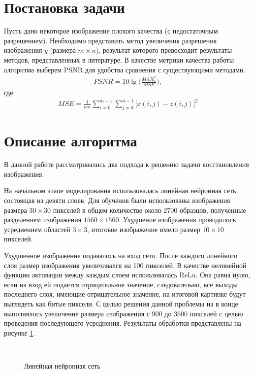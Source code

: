 \documentclass[12pt,twoside]{article}
\begin{document}
\section{Постановка задачи}
	Пусть дано некоторое изображение плохого качества (с недостаточным разрешением). Необходимо представить метод увеличения разрешения изображения $y$ (размера $m\times n$), результат которого превосходит результаты методов, представленных в литературе. В качестве метрики качества работы алгоритма выберем PSNR для удобства сравнения с существующими методами. 
	\begin{gather}
		PSNR = 10\lg\bigg(\frac{MAX_x^2}{MSE} \bigg),
	\end{gather}
	где
	\begin{gather}
		MSE = \frac{1}{mn}\sum_{i=0}^{m-1}\sum_{j=0}^{n-1}\big[x(i,j)-z(i,j)\big]^2
	\end{gather}
	
\section{Описание алгоритма}

	В данной работе рассматривались два подхода к решению задачи восстановления изображения. 

	На начальном этапе моделирования использовалась линейная нейронная сеть, состоящая из девяти слоев. Для обучения были использованы изображения размера $30 \times 30$ пикселей в общем количестве около 2700 образцов, полученные разделением изображения $1560 \times 1560$. Ухудшение изображения проводилось усреднением областей $3 \times 3$, итоговое изображение имело размер $10 \times 10$ пикселей.
	
	Ухудшенное изображение подавалось на вход сети. После каждого линейного слоя размер изображения увеличивался на 100 пикселей. В качестве нелинейной функции активации между каждым слоем использовалась ReLu. Она равна нулю, если на вход ей подается отрицательное значение, следовательно, все выходы последнего слоя, имеющие отрицательное значение, на итоговой картинке будут выглядеть как битые пиксели. С целью решения данной проблемы на в конце выполнялось увеличение размера изображения с 900 до 3600 пикселей с целью проведения последующего усреднения. Результаты обработки представлены на рисунке \ref{fig:linear}.




\begin{figure}[h]
	\centering
	\\
	\caption{Линейная нейронная сеть}
	\label{fig:linear}
\end{figure}
\end{document}
